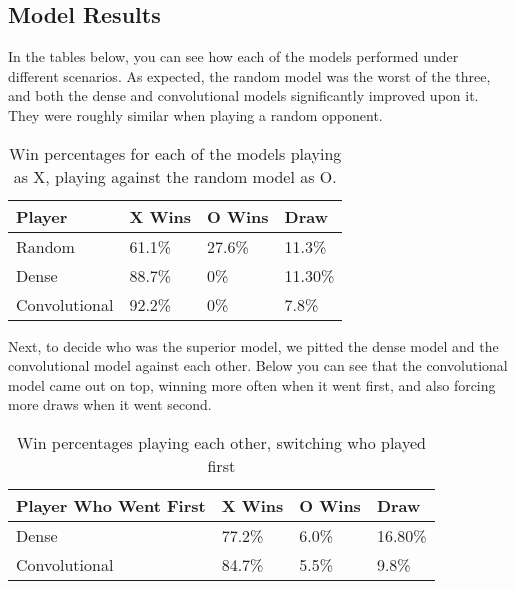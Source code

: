 \subsection{Model Results}

In the tables below, you can see how each of the models performed under different scenarios. As expected, the random model was the worst of the three, and both the dense and convolutional models significantly improved upon it. They were roughly similar when playing a random opponent.

	\begin{table}[H]
	\centering
	\begin{tabular}{llll}
		\hline
		\textbf{Player} & \textbf{X Wins} & \textbf{O Wins} & \textbf{Draw} \\ \hline
		Random          & 61.1\%          & 27.6\%          & 11.3\%        \\
		Dense           & 88.7\%          & 0\%           & 11.30\%        \\
		Convolutional   & 92.2\%            & 0\%           & 7.8\%         \\ \hline
	\end{tabular}
	\caption{Win percentages for each of the models playing as X, playing against the random model as O.}
\end{table}

Next, to decide who was the superior model, we pitted the dense model and the convolutional model against each other. Below you can see that the convolutional model came out on top, winning more often when it went first, and also forcing more draws when it went second.

\begin{table}[H]
	\centering
	\begin{tabular}{llll}
		\hline
		\textbf{Player Who Went First} & \textbf{X Wins} & \textbf{O Wins} & \textbf{Draw} \\ \hline
		Dense           & 77.2\%          & 6.0\%           & 16.80\%        \\
		Convolutional   & 84.7\%            & 5.5\%           & 9.8\%         \\ \hline
	\end{tabular}
	\caption{Win percentages playing each other, switching who played first}
\end{table}

